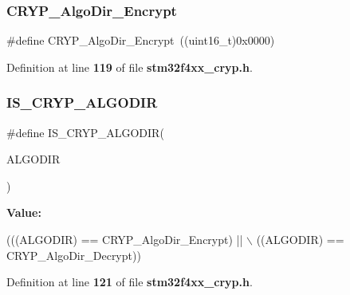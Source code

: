 \subsubsection{C\+R\+Y\+P\+\_\+\+Algo\+Dir\+\_\+\+Encrypt}
{\footnotesize\ttfamily \#define C\+R\+Y\+P\+\_\+\+Algo\+Dir\+\_\+\+Encrypt~((uint16\+\_\+t)0x0000)}



Definition at line \textbf{ 119} of file \textbf{ stm32f4xx\+\_\+cryp.\+h}.

\mbox{\label{group__CRYP__Algorithm__Direction_ga6aeed434566ddf0c9a7c9f26a1abf1f3}} 
\subsubsection{I\+S\+\_\+\+C\+R\+Y\+P\+\_\+\+A\+L\+G\+O\+D\+IR}
{\footnotesize\ttfamily \#define I\+S\+\_\+\+C\+R\+Y\+P\+\_\+\+A\+L\+G\+O\+D\+IR(\begin{DoxyParamCaption}\item[{}]{A\+L\+G\+O\+D\+IR }\end{DoxyParamCaption})}

{\bfseries Value\+:}
\begin{DoxyCode}
(((ALGODIR) == CRYP_AlgoDir_Encrypt) || \(\backslash\)
                                  ((ALGODIR) == CRYP_AlgoDir_Decrypt))
\end{DoxyCode}


Definition at line \textbf{ 121} of file \textbf{ stm32f4xx\+\_\+cryp.\+h}.

